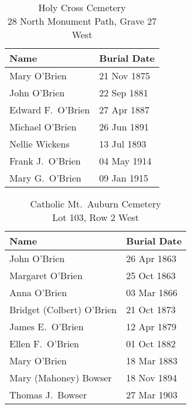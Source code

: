 \begin{table}[h]
	\centering
	\caption{Holy Cross Cemetery \\
		28 North Monument Path, Grave 27 West}
	\begin{tabular}{|l|l|}
		\hline
		\textbf{Name} & \textbf{Burial Date} \\
		\hline
		Mary O'Brien & 21 Nov 1875 \\
		\hline
		John O'Brien & 22 Sep 1881 \\
		\hline
		Edward F.\ O'Brien & 27 Apr 1887 \\
		\hline
		Michael O'Brien & 26 Jun 1891 \\
		\hline
		Nellie Wickens & 13 Jul 1893 \\
		\hline
		Frank J.\ O'Brien & 04 May 1914 \\
		\hline
		Mary G.\ O'Brien & 09 Jan 1915 \\
		\hline
	\end{tabular}
\end{table}

\begin{table}[h]
	\centering
	\caption{Catholic Mt.\ Auburn Cemetery \\
		Lot 103, Row 2 West}
	\begin{tabular}{|l|l|}
		\hline
		\textbf{Name} & \textbf{Burial Date} \\
		\hline
		John O'Brien & 26 Apr 1863 \\
		\hline
		Margaret O'Brien & 25 Oct 1863 \\
		\hline
		Anna O'Brien & 03 Mar 1866 \\
		\hline
		Bridget (Colbert) O'Brien & 21 Oct 1873 \\
		\hline
		James E.\ O'Brien & 12 Apr 1879 \\
		\hline
		Ellen F.\ O'Brien & 01 Oct 1882 \\
		\hline
		Mary O'Brien & 18 Mar 1883 \\
		\hline
		Mary (Mahoney) Bowser & 18 Nov 1894 \\
		\hline
		Thomas J.\ Bowser & 27 Mar 1903 \\
		\hline
	\end{tabular}
\end{table}

